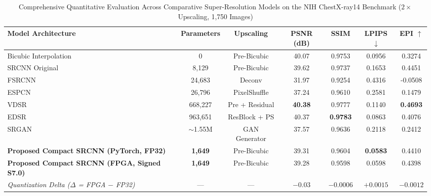 \documentclass[conference]{IEEEtran}
\begin{document}
\begin{table}[!t]
\caption{Comprehensive Quantitative Evaluation Across Comparative Super-Resolution Models on the NIH ChestX-ray14 Benchmark ($2\times$ Upscaling, 1,750 Images)}
\label{tab:image_quality_benchmark}
\centering
\small
\setlength{\tabcolsep}{8pt}
\begin{tabular}{lcccccc}
\toprule
\textbf{Model Architecture} & \textbf{Parameters} & \textbf{Upscaling} & \textbf{PSNR (dB)} & \textbf{SSIM} & \textbf{LPIPS $\downarrow$} & \textbf{EPI $\uparrow$} \\
\midrule
Bicubic Interpolation & 0 & Pre-Bicubic & 40.07 & 0.9753 & 0.0956 & 0.3274 \\
SRCNN Original \cite{dong2014learning} & 8,129 & Pre-Bicubic & 39.62 & 0.9737 & 0.1653 & 0.4451 \\
FSRCNN \cite{dong2016accelerating} & 24,683 & Deconv & 31.97 & 0.9254 & 0.4316 & -0.0508 \\
ESPCN \cite{shi2016real} & 26,796 & PixelShuffle & 37.24 & 0.9610 & 0.2581 & 0.1479 \\
VDSR \cite{kim2016accurate} & 668,227 & Pre + Residual & \textbf{40.38} & 0.9777 & 0.1140 & \textbf{0.4693} \\
EDSR \cite{lim2017enhanced} & 963,651 & ResBlock + PS & 40.37 & \textbf{0.9783} & 0.0863 & 0.4076 \\
SRGAN \cite{ledig2017photo} & $\sim$1.55M & GAN Generator & 37.57 & 0.9636 & 0.2118 & 0.2412 \\
\midrule
\textbf{Proposed Compact SRCNN (PyTorch, FP32)} & \textbf{1,649} & Pre-Bicubic & 39.31 & 0.9604 & \textbf{0.0583} & 0.4410 \\
\textbf{Proposed Compact SRCNN (FPGA, Signed S7.0)} & \textbf{1,649} & Pre-Bicubic & 39.28 & 0.9598 & 0.0598 & 0.4398 \\
\midrule
\textit{Quantization Delta ($\Delta$ = FPGA $-$ FP32)} & --- & --- & $-0.03$ & $-0.0006$ & $+0.0015$ & $-0.0012$ \\
\bottomrule
\end{tabular}
\end{table}
\end{document}
